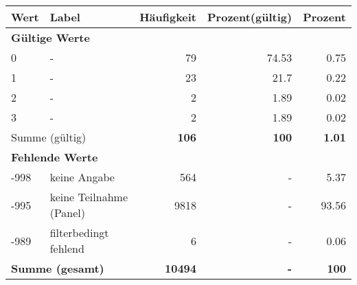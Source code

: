      \begin{longtable}{lXrrr}
     \toprule
     \textbf{Wert} & \textbf{Label} & \textbf{Häufigkeit} & \textbf{Prozent(gültig)} & \textbf{Prozent} \\
     \endhead
     \midrule
     \multicolumn{5}{l}{\textbf{Gültige Werte}}\\

     0 &
     \multicolumn{1}{X}{ -  } &


       \num{79} &
       \num[round-mode=places,round-precision=2]{74.53} &
         \num[round-mode=places,round-precision=2]{0.75} \\

     1 &
     \multicolumn{1}{X}{ -  } &


       \num{23} &
       \num[round-mode=places,round-precision=2]{21.7} &
         \num[round-mode=places,round-precision=2]{0.22} \\

     2 &
     \multicolumn{1}{X}{ -  } &


       \num{2} &
       \num[round-mode=places,round-precision=2]{1.89} &
         \num[round-mode=places,round-precision=2]{0.02} \\

     3 &
     \multicolumn{1}{X}{ -  } &


       \num{2} &
       \num[round-mode=places,round-precision=2]{1.89} &
         \num[round-mode=places,round-precision=2]{0.02} \\
     \midrule
     \multicolumn{2}{l}{Summe (gültig)} &
       \textbf{\num{106}} &
     \textbf{\num{100}} &
       \textbf{\num[round-mode=places,round-precision=2]{1.01}} \\
     \multicolumn{5}{l}{\textbf{Fehlende Werte}}\\
       -998 &
       keine Angabe &
         \num{564} &
        - &
         \num[round-mode=places,round-precision=2]{5.37} \\
       -995 &
       keine Teilnahme (Panel) &
         \num{9818} &
        - &
         \num[round-mode=places,round-precision=2]{93.56} \\
       -989 &
       filterbedingt fehlend &
         \num{6} &
        - &
         \num[round-mode=places,round-precision=2]{0.06} \\
     \midrule
     \multicolumn{2}{l}{\textbf{Summe (gesamt)}} &
          \textbf{\num{10494}} &
        \textbf{-} &
        \textbf{\num{100}} \\
     \bottomrule
     \end{longtable}
     
